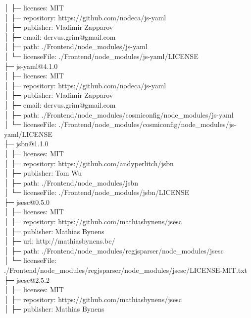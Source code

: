 \documentclass[
    paper=a4,
    twoside=false,
    parskip=half,
    listof=entryprefix,
    listof=totoc,
    index=totoc,
    bibliography=totoc,
    headsepline,
]{scrbook}
\begin{document}
    │  ├─ licenses: MIT\\
    │  ├─ repository: https://github.com/nodeca/js-yaml\\
    │  ├─ publisher: Vladimir Zapparov\\
    │  ├─ email: dervus.grim@gmail.com\\
    │  ├─ path: ./Frontend/node\_modules/js-yaml\\
    │  └─ licenseFile: ./Frontend/node\_modules/js-yaml/LICENSE\\
    ├─ js-yaml@4.1.0\\
    │  ├─ licenses: MIT\\
    │  ├─ repository: https://github.com/nodeca/js-yaml\\
    │  ├─ publisher: Vladimir Zapparov\\
    │  ├─ email: dervus.grim@gmail.com\\
    │  ├─ path: ./Frontend/node\_modules/cosmiconfig/node\_modules/js-yaml\\
    │  └─ licenseFile: ./Frontend/node\_modules/cosmiconfig/node\_modules/js-yaml/LICENSE\\
    ├─ jsbn@1.1.0\\
    │  ├─ licenses: MIT\\
    │  ├─ repository: https://github.com/andyperlitch/jsbn\\
    │  ├─ publisher: Tom Wu\\
    │  ├─ path: ./Frontend/node\_modules/jsbn\\
    │  └─ licenseFile: ./Frontend/node\_modules/jsbn/LICENSE\\
    ├─ jsesc@0.5.0\\
    │  ├─ licenses: MIT\\
    │  ├─ repository: https://github.com/mathiasbynens/jsesc\\
    │  ├─ publisher: Mathias Bynens\\
    │  ├─ url: http://mathiasbynens.be/\\
    │  ├─ path: ./Frontend/node\_modules/regjsparser/node\_modules/jsesc\\
    │  └─ licenseFile: ./Frontend/node\_modules/regjsparser/node\_modules/jsesc/LICENSE-MIT.txt\\
    ├─ jsesc@2.5.2\\
    │  ├─ licenses: MIT\\
    │  ├─ repository: https://github.com/mathiasbynens/jsesc\\
    │  ├─ publisher: Mathias Bynens\\
\end{document}
